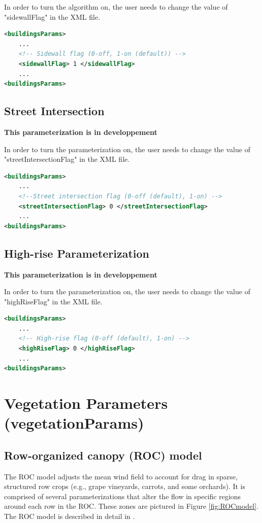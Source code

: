 In order to turn the algorithm on, the user needs to change the value of "sidewallFlag" in the XML file.

\begin{lstlisting}[language=XML]
<buildingsParams>
	...
	<!-- Sidewall flag (0-off, 1-on (default)) -->
	<sidewallFlag> 1 </sidewallFlag>
	...
<buildingsParams>
\end{lstlisting}

\subsection{Street Intersection}

\textbf{This parameterization is in developpement}

In order to turn the parameterization on, the user needs to change the value of "streetIntersectionFlag" in the XML file.

\begin{lstlisting}[language=XML]
<buildingsParams>
	...
	<!--Street intersection flag (0-off (default), 1-on) -->
    <streetIntersectionFlag> 0 </streetIntersectionFlag>
	...
<buildingsParams>
\end{lstlisting}

\subsection{High-rise Parameterization}

\textbf{This parameterization is in developpement}

In order to turn the parameterization on, the user needs to change the value of "highRiseFlag" in the XML file.

\begin{lstlisting}[language=XML]
<buildingsParams>
	...
	<!-- High-rise flag (0-off (default), 1-on) -->
    <highRiseFlag> 0 </highRiseFlag>
	...
<buildingsParams>
\end{lstlisting}


\section{Vegetation Parameters (vegetationParams)}

\subsection{Row-organized canopy (ROC) model}
The ROC model adjusts the mean wind field to account for drag in sparse, structured row crops (e.g., grape vineyards, carrots, and some orchards). It is comprised of several parameterizations that alter the flow in specific regions around each row in the ROC. These zones are pictured in Figure \ref{fig:ROCmodel}.
The ROC model is described in detail in \cite{ulmer2023fast}.

